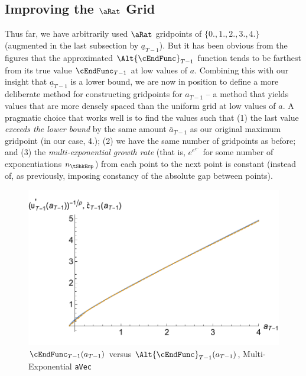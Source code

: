 \documentclass[titlepage]{\econtex}
\begin{document}

\hypertarget{Improving-the-a-Grid}{}
\subsection{Improving the $\aRat$ Grid}

Thus far, we have arbitrarily used $\aRat$ gridpoints of
$\{0.,1.,2.,3.,4.\}$ (augmented in the last subsection by
$\underline{a}_{T-1}$).  But it has been obvious from the figures that
the approximated $\Alt{\cEndFunc}_{T-1}$ function tends to be farthest from its true
value $\cEndFunc_{T-1}$ at low values of ${a}$.  Combining this with our insight that
$\underline{a}_{T-1}$ is a lower bound, we are now in position to
define a more deliberate method for constructing gridpoints for
${a}_{T-1}$ -- a method that yields values that are more densely
spaced than the uniform grid at low values of ${a}$.  A pragmatic
choice that works well is to find the values such that (1) the last
value \textit{exceeds the lower bound} by the same amount $\bar{a}_{T-1}$
as our original maximum gridpoint (in our case, 4.); (2) we have the
same number of gridpoints as before; and (3) the \textit{multi-exponential growth rate} (that is, $e^{e^{e^{...}}}$ for some
number of exponentiations $n_{\tShkEmp}$) from each point to the next point is
constant (instead of, as previously, imposing constancy of the
absolute gap between points).

\hypertarget{GothVInvVSGothCEEE}{}
\begin{figure}
        \includegraphics{./Figures/GothVInvVSGothCEEE}
        \caption{$\cEndFunc_{T-1}({a}_{T-1})$ versus
        $\Alt{\cEndFunc}_{T-1}({a}_{T-1})$, Multi-Exponential \texttt{aVec}}
        \label{fig:GothVInvVSGothCEE}
\end{figure}
\end{document}
